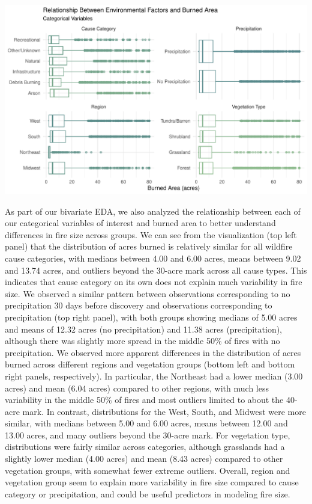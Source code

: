 \documentclass[
  letterpaper,
  DIV=11,
  numbers=noendperiod]{scrartcl}
\begin{document}
\includegraphics{written-report_files/figure-pdf/categorical-bivariate-dist-1.pdf}

As part of our bivariate EDA, we also analyzed the relationship between
each of our categorical variables of interest and burned area to better
understand differences in fire size across groups. We can see from the
visualization (top left panel) that the distribution of acres burned is
relatively similar for all wildfire cause categories, with medians
between 4.00 and 6.00 acres, means between 9.02 and 13.74 acres, and
outliers beyond the 30-acre mark across all cause types. This indicates
that cause category on its own does not explain much variability in fire
size. We observed a similar pattern between observations corresponding
to no precipitation 30 days before discovery and observations
corresponding to precipitation (top right panel), with both groups
showing medians of 5.00 acres and means of 12.32 acres (no
precipitation) and 11.38 acres (precipitation), although there was
slightly more spread in the middle 50\% of fires with no precipitation.
We observed more apparent differences in the distribution of acres
burned across different regions and vegetation groups (bottom left and
bottom right panels, respectively). In particular, the Northeast had a
lower median (3.00 acres) and mean (6.04 acres) compared to other
regions, with much less variability in the middle 50\% of fires and most
outliers limited to about the 40-acre mark. In contrast, distributions
for the West, South, and Midwest were more similar, with medians between
5.00 and 6.00 acres, means between 12.00 and 13.00 acres, and many
outliers beyond the 30-acre mark. For vegetation type, distributions
were fairly similar across categories, although grasslands had a
slightly lower median (4.00 acres) and mean (8.43 acres) compared to
other vegetation groups, with somewhat fewer extreme outliers. Overall,
region and vegetation group seem to explain more variability in fire
size compared to cause category or precipitation, and could be useful
predictors in modeling fire size.
\end{document}
